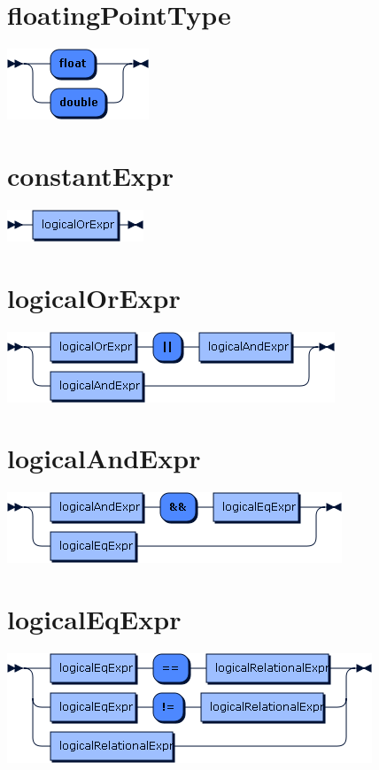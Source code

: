 \begin{appendices}
\section*{floatingPointType}\includegraphics[scale=0.7]{img/ebnf_grammar/floatingPointType}

\section*{constantExpr}\includegraphics[scale=0.7]{img/ebnf_grammar/constantExpr}
\section*{logicalOrExpr}\includegraphics[scale=0.7]{img/ebnf_grammar/logicalOrExpr}
\section*{logicalAndExpr}\includegraphics[scale=0.7]{img/ebnf_grammar/logicalAndExpr}
\section*{logicalEqExpr}\includegraphics[scale=0.7]{img/ebnf_grammar/logicalEqExpr}

\end{appendices}
